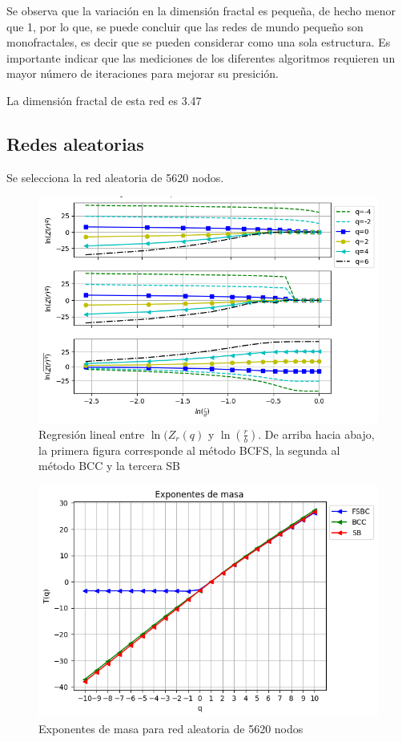 Se observa que la variación en la dimensión fractal es pequeña, de hecho menor que 1, por lo que, se puede concluir que las redes de mundo pequeño son monofractales, es decir que se pueden considerar como una sola estructura. Es importante indicar que las mediciones de los diferentes algoritmos requieren un mayor número de iteraciones para mejorar su presición.

La dimensión fractal de esta red es 3.47

\subsection{Redes aleatorias}

Se selecciona la red aleatoria de 5620 nodos.

\begin{figure}[H]
    \centering
    \includegraphics[scale=0.7]{Capitulo4Multifractalidad/imagenes/a_TqLnrBCrandom5620.png}
    \caption{Regresión lineal entre $\ln(Z_r(q)$ y $\ln(\frac{r}{b})$. De arriba hacia abajo, la primera figura corresponde al método BCFS, la segunda al método BCC y la tercera SB}
\end{figure}

\begin{figure}[H]
    \centering
    \includegraphics[scale=0.7]{Capitulo4Multifractalidad/imagenes/a_Tqrandom5620.png}
    \caption{Exponentes de masa para red aleatoria de 5620 nodos}
\end{figure}

